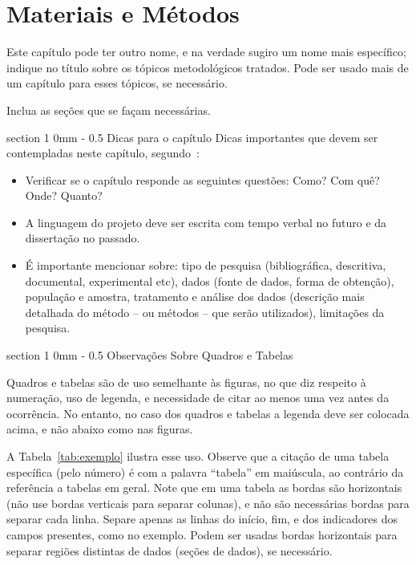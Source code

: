 \documentclass[a4paper, 12pt]{ppgeb}
\makeatletter
\renewcommand{\section}{\@startsection
{section}
{1}
{0mm}
{-\baselineskip}
{0.5\baselineskip}
{\large\bfseries\scshape}}
\makeatother
\begin{document}
\chapter{Materiais e Métodos}\label{chap:Metodologia}

Este capítulo pode ter outro nome, e na verdade sugiro um nome mais específico; indique no título sobre os tópicos metodológicos tratados. Pode ser usado mais de um capítulo para esses tópicos, se necessário.

Inclua as seções que se façam necessárias.

\section{Dicas para o capítulo}
Dicas importantes que devem ser contempladas neste capítulo, segundo~\cite{marconi.lakatos:2003}:
\begin{itemize}
\item Verificar se o capítulo responde as seguintes questões: Como? Com quê? Onde? Quanto?
\item A linguagem do projeto deve ser escrita com tempo verbal no futuro e da dissertação no passado.
\item É importante mencionar sobre: tipo de pesquisa (bibliográfica, descritiva, documental, experimental etc), dados (fonte de dados, forma de obtenção), população e amostra, tratamento e análise dos dados (descrição mais detalhada do método -- ou métodos -- que serão utilizados), limitações da pesquisa.
\end{itemize}

\section{Observações Sobre Quadros e Tabelas}

Quadros e tabelas são de uso semelhante às figuras, no que diz respeito à numeração, uso de legenda, e necessidade de citar ao menos uma vez antes da ocorrência. No entanto, no caso dos quadros e tabelas a legenda deve ser colocada acima, e não abaixo como nas figuras.

A Tabela~\ref{tab:exemplo} ilustra esse uso. Observe que a citação de uma tabela específica (pelo número) é com a palavra ``tabela'' em maiúscula, ao contrário da referência a tabelas em geral. Note que em uma tabela as bordas são horizontais (não use bordas verticais para separar colunas), e não são necessárias bordas para separar cada linha. Separe apenas as linhas do início, fim, e dos indicadores dos campos presentes, como no exemplo. Podem ser usadas bordas horizontais para separar regiões distintas de dados (seções de dados), se necessário.
\end{document}
